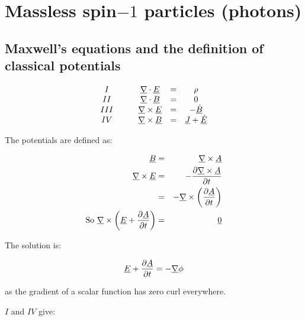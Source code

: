 
\chapter{Massless spin\texorpdfstring{$-1$}{1} particles (photons)}

\section{Maxwell's equations and the definition of classical potentials}

\[
  \begin{array}{ccccc}
  I   & \quad & \underline{\nabla}\cdot\underline{E}  & = & \rho \\
  II  &       & \underline{\nabla}\cdot\underline{B}  & = & 0 \\
  III &       & \underline{\nabla}\times\underline{E} & = & -\underline{\dot{B}} \\
  IV  &       & \underline{\nabla}\times\underline{B} & = & \underline{J} + \underline{\dot{E}}
  \end{array}
\]

The potentials are defined as:

\begin{eqnarray*}
  \underline{B} & = & \underline{\nabla}\times\underline{A} \\
  \underline{\nabla}\times\underline{E} & = & -\frac{\partial \underline{\nabla}\times\underline{A}}{\partial t} \\
  & = & -\underline{\nabla}\times{\left(\frac{\partial \underline{A}}{\partial t}\right)} \\
  \textrm{So } \underline{\nabla}\times{\left(\underline{E} + \frac{\partial\underline{A}}{\partial t}\right)} & = & \underline{0}
\end{eqnarray*}

The solution is:

\[
  \underline{E} + \frac{\partial \underline{A}}{\partial t} = -\underline{\nabla}\phi
\]

as the gradient of a scalar function has zero curl everywhere.

$I$ and $IV$ give:

